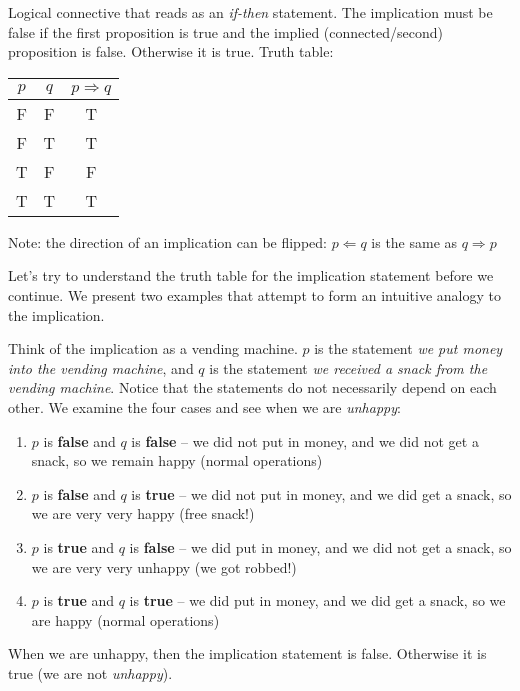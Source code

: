 \documentclass[main.tex]{subfiles}
\begin{document}
\begin{defn}
	Logical connective that reads as an \textit{if-then} statement. The implication must be false if the first proposition is true and the implied (connected/second) proposition is false. Otherwise it is true. Truth table:
	\begin{center}
		\begin{tabular}{c|c|c}
			\(p\) & \(q\) & \(p \Rightarrow q\) \\
			\hline
			F & F & T \\
			F & T & T \\
			T & F & F \\
			T & T & T
		\end{tabular}
	\end{center}
	Note: the direction of an implication can be flipped: \(p \Leftarrow q\) is the same as \(q \Rightarrow p\)
\end{defn}

Let's try to understand the truth table for the implication statement before we continue. We present two examples that attempt to form an intuitive analogy to the implication.

\begin{example}
	Think of the implication as a vending machine. \(p\) is the statement \textit{we put money into the vending machine}, and \(q\) is the statement \textit{we received a snack from the vending machine}. Notice that the statements do not necessarily depend on each other. We examine the four cases and see when we are \textit{unhappy}:
	
	\begin{enumerate}
		\item \(p\) is \textbf{false} and \(q\) is \textbf{false} -- we did not put in money, and we did not get a snack, so we remain happy (normal operations)
		\item \(p\) is \textbf{false} and \(q\) is \textbf{true} -- we did not put in money, and we did get a snack, so we are very very happy (free snack!)
		\item \(p\) is \textbf{true} and \(q\) is \textbf{false} -- we did put in money, and we did not get a snack, so we are very very unhappy (we got robbed!)
		\item \(p\) is \textbf{true} and \(q\) is \textbf{true} -- we did put in money, and we did get a snack, so we are happy (normal operations)
	\end{enumerate}
	
	When we are unhappy, then the implication statement is false. Otherwise it is true (we are not \textit{unhappy}).
\end{example}
\end{document}
